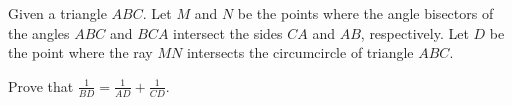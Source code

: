 Given a triangle $ABC$.
Let $M$ and $N$ be the points where the angle bisectors of the angles $ABC$ and $BCA$ intersect the sides $CA$ and $AB$, respectively.
Let $D$ be the point where the ray $MN$ intersects the circumcircle of triangle $ABC$.

Prove that $\frac{1}{BD}=\frac{1}{AD}+\frac{1}{CD}$.
